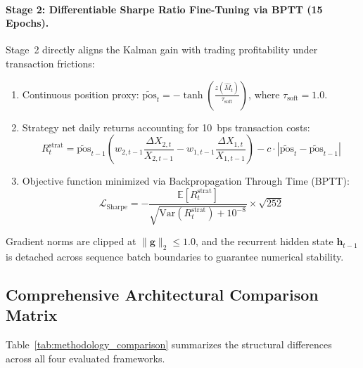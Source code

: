 \documentclass[11pt, a4paper]{article}
\begin{document}
\paragraph{Stage 2: Differentiable Sharpe Ratio Fine-Tuning via BPTT (15 Epochs).}
Stage~2 directly aligns the Kalman gain with trading profitability under transaction frictions:
\begin{enumerate}
    \item Continuous position proxy: $\widetilde{\text{pos}}_t = -\tanh\left( \frac{z(\hat{M}_t)}{\tau_{\text{soft}}} \right)$, where $\tau_{\text{soft}} = 1.0$.
    \item Strategy net daily returns accounting for 10~bps transaction costs:
    \begin{equation}
        R_t^{\text{strat}} = \widetilde{\text{pos}}_{t-1} \left( w_{2,t-1} \frac{\Delta X_{2,t}}{X_{2,t-1}} - w_{1,t-1} \frac{\Delta X_{1,t}}{X_{1,t-1}} \right) - c \cdot |\widetilde{\text{pos}}_t - \widetilde{\text{pos}}_{t-1}|
    \end{equation}
    \item Objective function minimized via Backpropagation Through Time (BPTT):
    \begin{equation}
        \mathcal{L}_{\text{Sharpe}} = - \frac{\mathbb{E}[R_t^{\text{strat}}]}{\sqrt{\text{Var}(R_t^{\text{strat}}) + 10^{-8}}} \times \sqrt{252}
    \end{equation}
\end{enumerate}
Gradient norms are clipped at $\|\mathbf{g}\|_2 \le 1.0$, and the recurrent hidden state $\mathbf{h}_{t-1}$ is detached across sequence batch boundaries to guarantee numerical stability.

\subsection{Comprehensive Architectural Comparison Matrix}
\label{sec:method_comparison_matrix}

Table~\ref{tab:methodology_comparison} summarizes the structural differences across all four evaluated frameworks.
\end{document}
